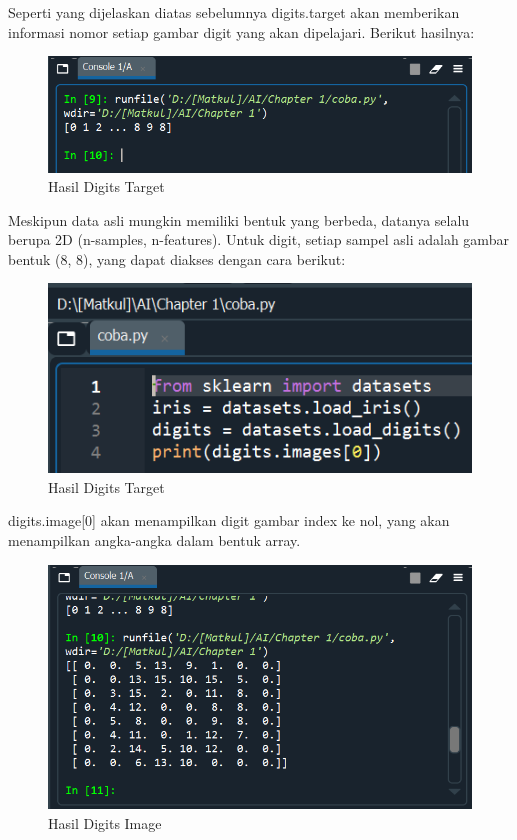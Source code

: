\par Seperti yang dijelaskan diatas sebelumnya digits.target akan memberikan informasi nomor setiap gambar digit yang akan dipelajari. Berikut hasilnya:
    \begin{figure}[H]
    \centering
    \includegraphics[width=13cm]{figures/1184023/7.PNG}
    \caption{Hasil Digits Target}
    \end{figure}

\par Meskipun data asli mungkin memiliki bentuk yang berbeda, datanya selalu berupa 2D (n-samples, n-features). Untuk digit, setiap sampel asli adalah gambar bentuk (8, 8), yang dapat diakses dengan cara berikut:
    \begin{figure}[H]
    \centering
    \includegraphics[width=13cm]{figures/1184023/8.PNG}
    \caption{Hasil Digits Target}
    \end{figure}

\par digits.image[0] akan menampilkan digit gambar index ke nol, yang akan menampilkan angka-angka dalam bentuk array.
    \begin{figure}[H]
    \centering
    \includegraphics[width=13cm]{figures/1184023/9.PNG}
    \caption{Hasil Digits Image}
    \end{figure}

